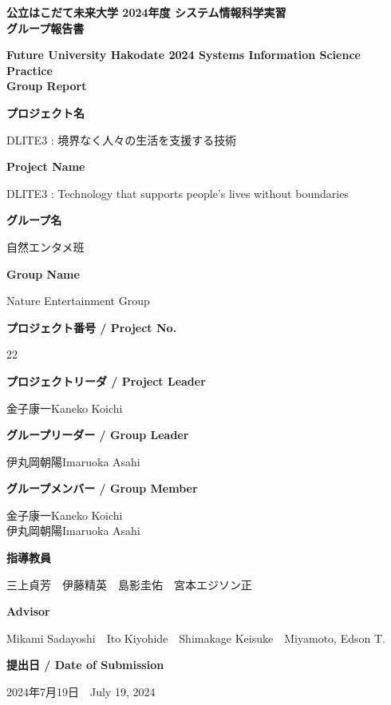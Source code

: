 \documentclass[11pt,a4paper]{report}
\newcommand{\AgendaBox}[2]{
    \large
    \textbf{#1}\\

    \vspace{0.2cm}

    \small 
    #2

    \vspace{0.5cm}
}
\newcommand{\NameBox}[2]{
    \small 
    #1\hspace{1cm}#2
}
\begin{document}
\thispagestyle{empty}
\begin{center}
    \large
    \textbf{
      公立はこだて未来大学 2024年度 システム情報科学実習\\
      グループ報告書
    }\\

    \vspace{0.2cm}

    \small 
    \textbf{
      Future University Hakodate 2024 Systems Information Science Practice\\Group Report
    }

    \vspace{0.5cm}

    \AgendaBox{プロジェクト名}{DLITE3 : 境界なく人々の生活を支援する技術}
    \AgendaBox{Project Name}{DLITE3 : Technology that supports people's lives without boundaries}
    \AgendaBox{グループ名}{自然エンタメ班}
    \AgendaBox{Group Name}{Nature Entertainment Group}
    \AgendaBox{プロジェクト番号 / Project No.}{22}
    \AgendaBox{プロジェクトリーダ / Project Leader}{金子康一\hspace{1cm}Kaneko Koichi}
    \AgendaBox{グループリーダー / Group Leader}{
      \NameBox{伊丸岡朝陽}{Imaruoka Asahi}\\
    }
    \AgendaBox{グループメンバー / Group Member}{
      \NameBox{金子康一}{Kaneko Koichi}\\
      \NameBox{伊丸岡朝陽}{Imaruoka Asahi}\\
    }
    \AgendaBox{指導教員}{
      三上貞芳　伊藤精英　島影圭佑　宮本エジソン正
    }
    \AgendaBox{Advisor}{
      Mikami Sadayoshi　Ito Kiyohide　Shimakage Keisuke　Miyamoto, Edson T.
    }
    \AgendaBox{提出日 / Date of Submission}{
      2024年7月19日　July 19, 2024
    }
    

\end{center}

\newpage
\thispagestyle{empty}
\mbox{}
\newpage

\clearpage
{}
\setcounter{page}{1}
\end{document}
